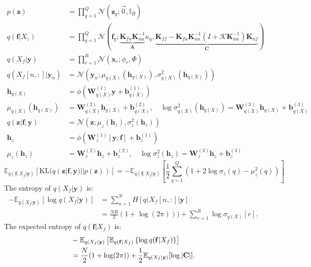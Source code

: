 \documentclass[12pt]{article}
\newcommand{\Kappa}{\mathcal{K}}
\newcommand{\xb}{\mathbf{x}}
\newcommand{\zb}{\mathbf{z}}
\newcommand{\fb}{\mathbf{f}}
\newcommand{\Cb}{\mathbf{C}}
\newcommand{\Ab}{\mathbf{A}}
\newcommand{\yb}{\mathbf{y}}
\newcommand{\Kff}{\mathbf{K}_{ff}}
\newcommand{\Kuu}{\mathbf{K}_{uu}}
\newcommand{\Kuf}{\mathbf{K}_{uf}}
\newcommand{\Kfu}{\mathbf{K}_{fu}}
\newcommand{\Ex}{\mathbb{E}}
\newcommand{\KL}{\mathrm{KL}}
\newcommand{\No}{\mathcal{N}}
\newcommand{\Wb}{\mathbf{W}}
\newcommand{\hb}{\mathbf{h}}
\newcommand{\bb}{\mathbf{b}}
\begin{document}
\begin{align}
p(\zb) &= \prod_{q=1}^Q \mathcal{N}(\zb_q; \vec{0}, \mathbb{I}_B) \\
q(\fb|X_z) &= \prod_{q=1}^Q \mathcal{N}(\fb_q; \underbrace{\Kfu\Kuu^{-1}}_{\Ab}\kappa_q, \underbrace{\Kff-\Kfu\Kuu^{-1}(I + \Kappa\Kuu^{-1})\Kuf}_{\Cb}) \\
q(X_f|\yb) &= \prod_{r=1}^R \mathcal{N}(\xb_r; \phi_r, \Phi) \\
q(X_f[n,:]|\yb_n) &= \No(\yb_n; \mu_{q(X)}(\hb_{q(X)}), \sigma^2_{q(X)}(\hb_{q(X)})) \\
\hb_{q(X)} &= \phi(\Wb^{(1)}_{q(X)}\yb + \bb^{(1)}_{q(X)}) \\
\mu_{q(X)}(\hb_{q(X)}) &= \Wb^{(2)}_{q(X)}\hb_{q(X)} + \bb^{(2)}_{q(X)},\quad \log\sigma^2_{q(X)}(\hb_{q(X)}) = \Wb^{(3)}_{q(X)}\hb_{q(X)} + \bb^{(3)}_{q(X)} \\
q(\zb|\fb,\yb) &= \No(\zb; \mu_z(\hb_z), \sigma^2_z(\hb_z)) \\
\hb_z &= \phi(\Wb^{(1)}_z[\yb,\fb] + \bb^{(1)}_z) \\
\mu_z(\hb_z) &= \Wb^{(2)}_z\hb_z + \bb^{(2)}_z,\quad \log\sigma^2_z(\hb_z) = \Wb^{(3)}_z\hb_z + \bb^{(3)}_z
\end{align}
%
\begin{equation}
\Ex_{q(\fb,X_f|\yb)}\left[\KL(q(\zb|\fb,\yb)||p(\zb))\right] = -\Ex_{q(\fb,X_f|\yb)}\left[ \frac{1}{2}\sum_{q=1}^Q\left( 1 + 2\log\sigma_z(q) - \mu^2_z(q) \right) \right]
\end{equation}
%
The entropy of $q(X_f|\yb)$ is:
%
\begin{align}
-\Ex_{q(X_f|\yb)}\left[\log q(X_f|\yb)\right] &= \sum_{n=1}^N H[q(X_f[n,:]|\yb] \\
&= \frac{NR}{2}(1+\log(2\pi))) + \sum_{r=1}^R\log\sigma_{q(X)}[r].
\end{align}
%
The expected entropy of $q(\fb|X_f)$ is:
%
\begin{align}
    &- \Ex_{q(X_f|\yb)}\left[ \Ex_{q(\fb|X_f)}\left\{\log q(\fb|X_f) \right\} \right] \notag \\
    &= \frac{N}{2}(1 + \log (2\pi)) + \frac{1}{2} \Ex_{q(X_f|\yb)}[\log|\Cb|].
\end{align}
%
\end{document}

